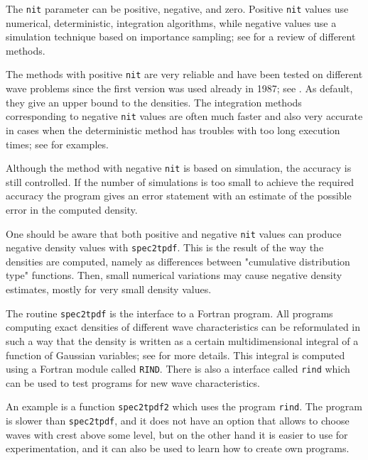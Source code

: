 The {\tt nit} parameter can be positive, negative, and zero.
Positive {\tt nit} values use numerical, deterministic, integration
algorithms, while negative values use a simulation technique
based on importance sampling; see \cite{Brodtkorb2004Probability,
Brodtkorb2006Evaluating} for a review of different methods.

The methods with positive {\tt nit} are very reliable and have
been tested on different wave problems since the first version was
used already in 1987; see \cite{Rychlik1987Regression}. As default,
they give an upper bound to the densities.
The integration methods corresponding to negative {\tt  nit} values are
often much faster and also very accurate in cases when the
deterministic method has troubles with too long execution times;
see \cite{Lindgren2017} for examples. 

Although the method  with negative {\tt nit} is based on
simulation, the accuracy is still controlled. If the number of
simulations is too small to achieve the required accuracy
the program gives an error statement with an estimate of
the possible error in the computed density.

One should be aware that both positive and negative {\tt nit} values
can produce negative density values with {\tt spec2tpdf}. This is
the result of the way  the densities are computed, namely as differences
between "cumulative distribution type" functions. Then, small numerical
variations may cause negative density estimates, mostly for very
small density values.

The routine {\tt spec2tpdf} is the \ML{} interface to a
{\sc Fortran} program. All programs computing exact
densities of different wave characteristics
can be reformulated in such a way that the density is written as a
certain multidimensional integral of a function of Gaussian
variables; see \cite{LindgrenAndRychlik1991Slepian} for more details.
This integral is computed using a {\sc Fortran} module called
{\tt RIND}. There is also a \ML{} interface called
{\tt rind} which can be
used to test programs for new wave characteristics.

An example is a function {\tt spec2tpdf2} which uses the program
{\tt rind}. The program is slower than {\tt spec2tpdf},
and it does not have an option that allows to choose waves with crest
above some level, but on the other hand it is easier to use for
experimentation, and it can also be used to learn how to
create own programs.

